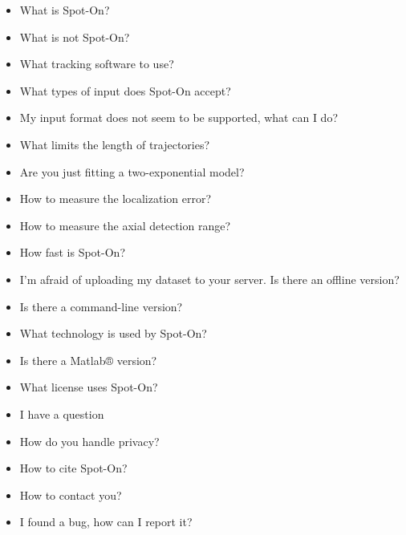 \begin{itemize}
{\begin{itemize}
  \item  What is Spot-On?
  \item  What is not Spot-On?
  \item  What tracking software to use?
  \item  What types of input does Spot-On accept?
  \item  My input format does not seem to be supported, what can I do?
  \item  What limits the length of trajectories?
  \item  Are you just fitting a two-exponential model?
  \item  How to measure the localization error?
  \item  How to measure the axial detection range?
  \item  How fast is Spot-On?
  \item  I'm afraid of uploading my dataset to your server. Is there an offline version?
  \item  Is there a command-line version?
  \item  What technology is used by Spot-On?
  \item  Is there a Matlab® version?
  \item  What license uses Spot-On?
  \item  I have a question
  \item  How do you handle privacy?
  \item  How to cite Spot-On?
  \item  How to contact you?
  \item  I found a bug, how can I report it?
  \end{itemize}
}
\end{itemize}


  


